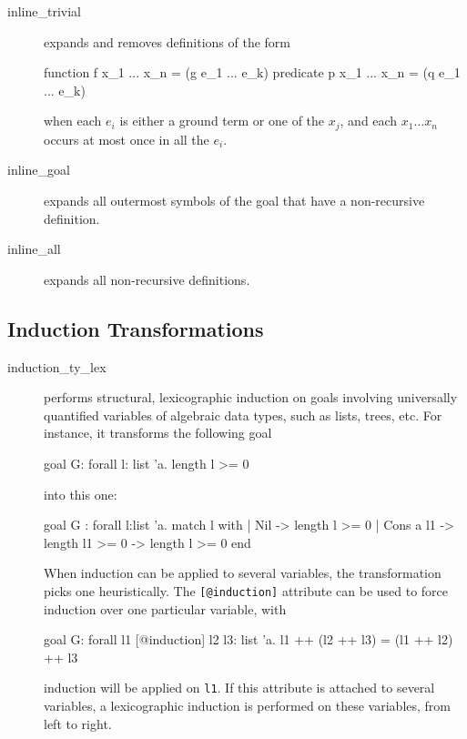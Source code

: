 \begin{description}

\item[inline\_trivial]
  expands and removes definitions of the form
\begin{whycode}
function  f x_1 ... x_n = (g e_1 ... e_k)
predicate p x_1 ... x_n = (q e_1 ... e_k)
\end{whycode}
when each $e_i$ is either a ground term or one of the $x_j$, and
each $x_1 \dots x_n$ occurs at most once in all the $e_i$.

\item[inline\_goal] expands all outermost symbols of the goal that
  have a non-recursive definition.

\item[inline\_all]
  expands all non-recursive definitions.

\end{description}


\subsection{Induction Transformations}

\begin{description}
\item[induction\_ty\_lex]
  performs structural, lexicographic induction on
  goals involving universally quantified variables of algebraic data
  types, such as lists, trees, etc. For instance, it transforms the
  following goal
\begin{whycode}
goal G: forall l: list 'a. length l >= 0
\end{whycode}
  into this one:
\begin{whycode}
goal G :
  forall l:list 'a.
     match l with
     | Nil -> length l >= 0
     | Cons a l1 -> length l1 >= 0 -> length l >= 0
     end
\end{whycode}
  When induction can be applied to several variables, the transformation
  picks one heuristically. The \verb|[@induction]| attribute can be used to
  force induction over one particular variable, \eg with
\begin{whycode}
goal G: forall l1 [@induction] l2 l3: list 'a.
        l1 ++ (l2 ++ l3) = (l1 ++ l2) ++ l3
\end{whycode}
induction will be applied on \verb|l1|. If this attribute is attached to
several variables, a lexicographic induction is performed on these
variables, from left to right.




\end{description}

